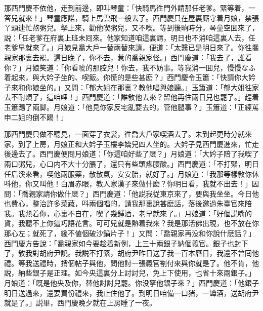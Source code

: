 那西門慶不依他，走到前邊，即叫琴童：「快騎馬徃門外請那任老爹。緊等着，一答兒就來！」琴童應諾，騎上馬雲飛一般去了。西門慶只在屋裏廝守着月娘，禁張丫頭連忙熬粥兒。拏上來，勸他喫粥兒，又不喫。等到後晌時分，琴童空囬來了，説：「任老爹在府裏上班未囘來。他家知道咱這裏請，明日也不消咱這裏人去，任老爹早就來了。」月娘見喬大戶一替兩替來請，便道：「太醫已是明日來了。你徃喬親家那裏去罷。這日晚了，你不去，惹的喬親家怪。」西門慶道：「我去了，誰看你？」月娘笑道：「你看唬的那腔兒！你去，我不妨事。等我消一囬兒，慢慢なふ着起來，與大妗子坐的、喫飯。你慌的是些甚麽？」西門慶令玉簫：「快請你大妗子來和你娘坐的。」又問：「郁大姐在那裏？教他唱與娘聽。」玉簫道：「郁大姐徃家去不耐煩了，這咱哩！」西門慶道：「誰敎他去來？留他再住兩日兒也罷了。」趕着玉簫踢了兩脚。月娘道：「他見你家反宅亂要去的，管他腿事？」玉簫道：「正經罵申二姐的倒不踢！」

那西門慶只做不聽見，一面穿了衣裳，徃喬大戶家喫酒去了。未到起更時分就來家，到了上房，月娘正和大妗子玉樓李嬌兒四人坐的。大妗子見西門慶進來，忙走後邊去了。西門慶便問月娘道：「你這咱好些了麽？」月娘道：「大妗子陪了我喫了兩口粥兒，心口内不大十分脹了，還只有些頭疼腰酸。」西門慶道：「不打緊，明日任后溪來看，喫他兩服薬，散散氣，安安胎，就好了。」月娘道：「我那等樣敎你休呌他，你又叫他！白眉赤眼，教人家漢子來做什麽？你明日看，我就不出去！」因問：「喬親家請你做什麽？」西門慶道：「他説我従東京來了，要與我坐坐。今日他也費心，整治許多菜蔬，呌兩個唱的，請我那裏說甚麽話，落後邀過朱臺官來陪我。我熱着你，心裏不自在，喫了幾鍾酒，老早就來了。」月娘道：「好個説嘴的貨，我聽不上你這巧語花言。可可兒就是熱着我來？我是那活佛出現，也不放在你那心左；就死了，纔不値個破沙鍋片子！」又問：「喬親家再没和你說什麽話？」西門慶方告說：「喬親家如今要趁着新例，上三十兩銀子納個義官。銀子也封下了，敎我對胡府尹說。我説不打緊，胡府尹昨日送了我一百本曆日，我還不曾囘他禮。等我送禮時，捎個帖子與他，問他討一張義官劄付來與你就是了。他不肯，他説，納些銀子是正理。如今央這裏分上討討兒，免上下使用，也省十來兩銀子。」月娘道：「旣是他央及你，替他討討兒罷。你没拏他銀子來？」西門慶道：「他銀子明日送過來，還要買份禮來，我止住他了。到明日咱備一口猪，一罈酒，送胡府尹就是了。」説畢，西門慶晚夕就在上房睡了一夜。

